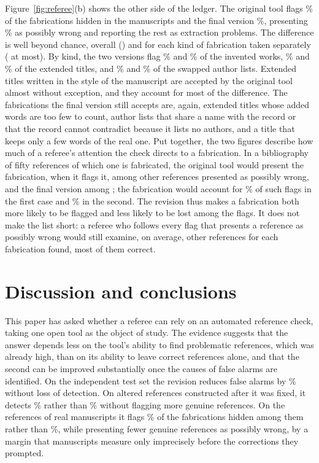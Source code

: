 \documentclass[pdflatex,sn-apa]{sn-jnl}
\begin{document}
Figure~\ref{fig:referee}(b) shows the other side of the ledger. The original tool flags \PlantDetBase{}\% of the fabrications hidden in the manuscripts and the final version \PlantDetRev{}\%, presenting \PlantDetScrutRev{}\% as possibly wrong and reporting the rest as extraction problems. The difference is well beyond chance, overall (\TestPlantP{}) and for each kind of fabrication taken separately (\TestPlantKindMaxP{} at most). By kind, the two versions flag \PlantDetBaseInvented{}\% and \PlantDetRevInvented{}\% of the invented works, \PlantDetBaseExtended{}\% and \PlantDetRevExtended{}\% of the extended titles, and \PlantDetBaseSwapped{}\% and \PlantDetRevSwapped{}\% of the swapped author lists. Extended titles written in the style of the manuscript are accepted by the original tool almost without exception, and they account for most of the difference. The fabrications the final version still accepts are, again, extended titles whose added words are too few to count, author lists that share a name with the record or that the record cannot contradict because it lists no authors, and a title that keeps only a few words of the real one. Put together, the two figures describe how much of a referee's attention the check directs to a fabrication. In a bibliography of fifty references of which one is fabricated, the original tool would present the fabrication, when it flags it, among \PlantNoiseBase{} other references presented as possibly wrong, and the final version among \PlantNoiseRev{}; the fabrication would account for \PlantShareBase{}\% of such flags in the first case and \PlantShareRev{}\% in the second. The revision thus makes a fabrication both more likely to be flagged and less likely to be lost among the flags. It does not make the list short: a referee who follows every flag that presents a reference as possibly wrong would still examine, on average, \PlantNoiseRev{} other references for each fabrication found, most of them correct.

\section{Discussion and conclusions}
\label{sec:disc}

This paper has asked whether a referee can rely on an automated reference check, taking one open tool as the object of study. The evidence suggests that the answer depends less on the tool's ability to find problematic references, which was already high, than on its ability to leave correct references alone, and that the second can be improved substantially once the causes of false alarms are identified. On the independent test set the revision reduces false alarms by \IndFPDrop{}\% without loss of detection. On altered references constructed after it was fixed, it detects \ConDetRev{}\% rather than \ConDetBase{}\% without flagging more genuine references. On the references of real manuscripts it flags \PlantDetRev{}\% of the fabrications hidden among them rather than \PlantDetBase{}\%, while presenting fewer genuine references as possibly wrong, by a margin that \CorpMss{} manuscripts measure only imprecisely before the corrections they prompted.
\end{document}
